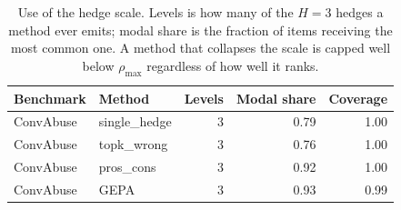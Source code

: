 \begin{table}[t]
\centering
\small
\begin{tabular}{llrrr}
\hline
Benchmark & Method & Levels & Modal share & Coverage \\
\hline
ConvAbuse & single\_hedge & 3 & 0.79 & 1.00 \\
ConvAbuse & topk\_wrong & 3 & 0.76 & 1.00 \\
ConvAbuse & pros\_cons & 3 & 0.92 & 1.00 \\
ConvAbuse & GEPA & 3 & 0.93 & 0.99 \\
\hline
\end{tabular}
\caption{Use of the hedge scale. Levels is how many of the $H=3$ hedges a method ever emits; modal share is the fraction of items receiving the most common one. A method that collapses the scale is capped well below $\rho_{\max}$ regardless of how well it ranks.}
\label{tab:stability}
\end{table}